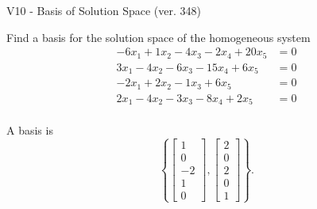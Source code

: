 \begin{exercise}
  \begin{exerciseTitle}V10 - Basis of Solution Space (ver. 348)\end{exerciseTitle}
  \begin{exerciseStatement}
    Find a basis for the solution space of the homogeneous system 
\begin{align*}
 -6 x_ 1 + 1 x_ 2 -4 x_ 3 -2 x_ 4 + 20 x_ 5 &= 0  \\ 
  3 x_ 1 -4 x_ 2 -6 x_ 3 -15 x_ 4 + 6 x_ 5 &= 0  \\ 
  -2 x_ 1 + 2 x_ 2 -1 x_ 3 + 6 x_ 5 &= 0  \\ 
  2 x_ 1 -4 x_ 2 -3 x_ 3 -8 x_ 4 + 2 x_ 5 &= 0  \\ 
 \end{align*}


 
  \end{exerciseStatement}

  \begin{exerciseAnswer}
   A basis is   
\[\left\{\left[\begin{array}{c}
1 \\
0 \\
-2 \\
1 \\
0
\end{array}\right] , \left[\begin{array}{c}
2 \\
0 \\
2 \\
0 \\
1
\end{array}\right]\right\}.\]

  


  \end{exerciseAnswer}
\end{exercise}